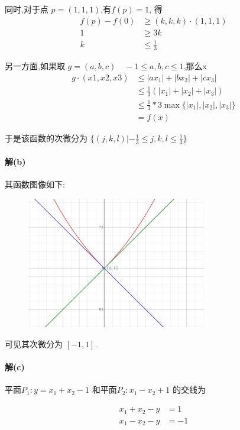 \documentclass[a4paper]{article}
\begin{document}
同时,对于点 \(p=(1,1,1)\),有\(f(p) = 1\), 得 
\[\begin{aligned}
     f(p) - f(0) &\geq (k,k,k) \cdot (1,1,1)\\
     1 &\geq 3k \\
     k &\leq \frac{1}{3}
\end{aligned}\]

另一方面,如果取 $g = (a,b,c) \quad -1 \leq a,b,c \leq 1 $,那么x
 \[\begin{aligned}
    g \cdot (x1,x2,x3)  & \leq |ax_1| + |bx_2| + |cx_3|  \\
    &\leq \frac{1}{3}(|x_1| + |x_2| + |x_3|)  \\
    &\leq \frac{1}{3} * 3 \max\{|x_1|,|x_2|,|x_3|\}  \\
    & = f(x) 
\end{aligned}\]


于是该函数的次微分为 \(\{(j,k,l) | -\frac{1}{3} \leq j,k,l \leq \frac{1}{3}\}\)

\paragraph{解(b)}
其函数图像如下:

\begin{figure}[H]
    \centering
    \includegraphics[width=0.7\textwidth]{pic/p5s2.png}
\end{figure}

可见其次微分为 \([-1,1]\).
\paragraph{解(c)}

平面\(P_1 : y = x_1 + x_2 - 1\) 和平面\(P_2 : x_1 - x_2 + 1\) 的交线为

\[ \begin{aligned}
    x_1 + x_2 - y & = 1 \\
    x_1 - x_2 - y & = -1
\end{aligned}\]
\end{document}
